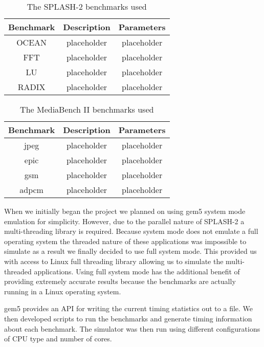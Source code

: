 \begin{table}[!t]
	\renewcommand{\arraystretch}{1.9}
	\label{tab:splash2_benchmarks}
	\centering
	\begin{tabular}{|c|c|c|}
		\hline
		Benchmark & Description & Parameters\\
		\hline
		OCEAN & placeholder & placeholder\\
		\hline
		FFT & placeholder & placeholder\\
		\hline
		LU & placeholder & placeholder\\
		\hline
		RADIX & placeholder & placeholder\\
		\hline
	\end{tabular}
	\caption{The SPLASH-2 benchmarks used}	
\end{table}

\begin{table}[!t]
	\renewcommand{\arraystretch}{1.9}
	\label{tab:mb2_benchmarks}
	\centering
	\begin{tabular}{|c|c|c|}
		\hline
		Benchmark & Description & Parameters\\
		\hline
		jpeg & placeholder & placeholder\\
		\hline
		epic & placeholder & placeholder\\
		\hline
		gsm & placeholder & placeholder\\
		\hline
		adpcm & placeholder & placeholder\\
		\hline
	\end{tabular}
	\caption{The MediaBench II benchmarks used}	
\end{table}

When we initially began the project we planned on using gem5 system mode emulation for simplicity. However, due to the parallel nature of SPLASH-2 a multi-threading library is required. Because system mode does not emulate a full operating system the threaded nature of these applications was impossible to simulate as a result we finally decided to use full system mode. This provided us with access to Linux full threading library allowing us to simulate the multi-threaded applications. Using full system mode has the additional benefit of providing extremely accurate results because the benchmarks are actually running in a Linux operating system.

gem5 provides an API for writing the current timing statistics out to a file. We then developed scripts to run the benchmarks and generate timing information about each benchmark. The simulator was then run using different configurations of CPU type and number of cores.




